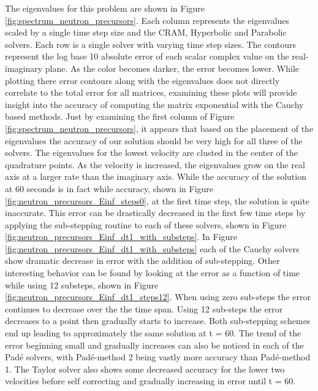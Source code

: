 The eigenvalues for this problem are shown in Figure \ref{fig:spectrum_neutron_precursors}. Each column represents the eigenvalues scaled by a single time step size and the CRAM, Hyperbolic and Parabolic solvers. Each row is a single solver with varying time step sizes. The contours represent the log base 10 absolute error of each scalar complex value on the real-imaginary plane. As the color becomes darker, the error becomes lower. While plotting there error contours along with the eigenvalues does not directly correlate to the total error for all matrices, examining these plots will provide insight into the accuracy of computing the matrix exponential with the Cauchy based methods. Just by examining the first column of Figure \ref{fig:spectrum_neutron_precursors}, it appears that based on the placement of the eigenvalues the accuracy of our solution should be very high for all three of the solvers. The eigenvalues for the lowest velocity are clusted in the center of the quadrature points. As the velocity is increased, the eigenvalues grow on the real axis at a larger rate than the imaginary axis. While the accuracy of the solution at 60 seconds is in fact while accuracy, shown in Figure \ref{fig:neutron_precursors_Einf_steps0}, at the first time step, the solution is quite inaccurate. This error can be drastically decreased in the first few time steps by applying the sub-stepping routine to each of these solvers, shown in Figure \ref{fig:neutron_precursors_Einf_dt1_with_substeps}. In Figure \ref{fig:neutron_precursors_Einf_dt1_with_substeps} each of the Cauchy solvers show dramatic decrease in error with the addition of sub-stepping. Other interesting behavior can be found by looking at the error as a function of time while using 12 substeps, shown in Figure \ref{fig:neutron_precursors_Einf_dt1_steps12}. When using zero sub-steps the error continues to decrease over the the time span. Using 12 sub-steps the error decreases to a point then gradually starts to increase. Both sub-stepping schemes end up leading to approximately the same solution at t = 60. The trend of the error beginning small and gradually increases can also be noticed in each of the Pad\'e solvers, with Pad\'e-method 2 being vastly more accuracy than Pad\'e-method 1. The Taylor solver also shows some decreased accuracy for the lower two velocities before self correcting and gradually increasing in error until t = 60. 

